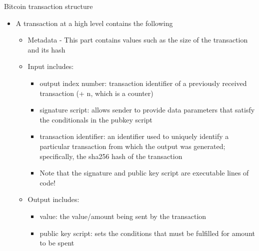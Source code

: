 \documentclass[11pt]{beamer}
\begin{document}
\begin{frame}{Bitcoin transaction structure}
	\begin{itemize}
		\item A transaction at a high level contains the following
		\begin{itemize}
			\item Metadata - This part contains values such as the size of the transaction and its hash
			\item Input includes:
			\begin{itemize}
				\item output index number: transaction identifier of a previously received transaction (+ n, which is a counter)
				\item signature script: allows sender to provide data parameters that satisfy the conditionals in the pubkey script
				\item transaction identifier: an identifier used to uniquely identify a particular transaction from which the output was generated; specifically, the sha256 hash of the transaction
				\item Note that the signature and public key script are executable lines of code!
			\end{itemize}
			\item Output includes:
			\begin{itemize}
				\item value: the value/amount being sent by the transaction
				\item public key script: sets the conditions that must be fulfilled for amount to be spent
			\end{itemize}
		\end{itemize}
	\end{itemize}
\end{frame}


\end{document}
